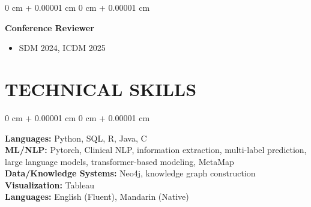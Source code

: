 \documentclass[10pt, letterpaper]{article}
\newenvironment{highlights}{
    \begin{itemize}[
        topsep=0.10 cm,
        parsep=0.10 cm,
        partopsep=0pt,
        itemsep=0pt,
        leftmargin=0 cm + 10pt
    ]
}{
    \end{itemize}
} %
\newenvironment{onecolentry}{
    \begin{adjustwidth}{
        0 cm + 0.00001 cm
    }{
        0 cm + 0.00001 cm
    }
}{
    \end{adjustwidth}
} %
\begin{document}
    \vspace{0.2 cm}
    
    \begin{onecolentry}
    \textbf{Conference Reviewer}
    \begin{highlights}
    \item SDM 2024, ICDM 2025
    \end{highlights}
    \end{onecolentry}
    



    \section{TECHNICAL SKILLS}

\begin{onecolentry}
\textbf{Languages:} Python, SQL, R, Java, C \\
\textbf{ML/NLP:} Pytorch, Clinical NLP, information extraction, multi-label prediction, large language models, transformer-based modeling, MetaMap \\
\textbf{Data/Knowledge Systems:} Neo4j, knowledge graph construction \\
\textbf{Visualization:} Tableau \\
\textbf{Languages:} English (Fluent), Mandarin (Native)
\end{onecolentry}

    
    

    
\end{document}
